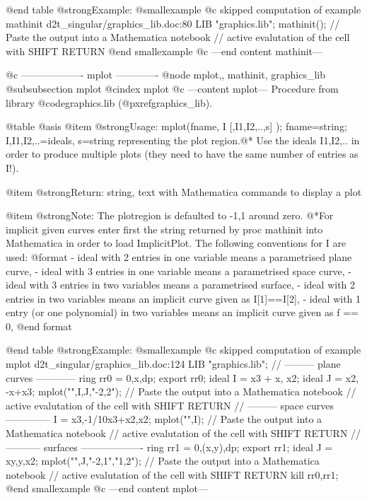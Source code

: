 @end table
@strong{Example:}
@smallexample
@c skipped computation of example mathinit d2t_singular/graphics_lib.doc:80 
LIB "graphics.lib";
mathinit();
// Paste the output into a Mathematica notebook
// active evalutation of the cell with SHIFT RETURN
@end smallexample
@c ---end content mathinit---

@c ------------------- mplot -------------
@node mplot,, mathinit, graphics_lib
@subsubsection mplot
@cindex mplot
@c ---content mplot---
Procedure from library @code{graphics.lib} (@pxref{graphics_lib}).

@table @asis
@item @strong{Usage:}
mplot(fname, I [,I1,I2,..,s] ); fname=string; I,I1,I2,..=ideals,
s=string representing the plot region.@*
Use the ideals I1,I2,.. in order to produce multiple plots (they need
to have the same number of entries as I!).

@item @strong{Return:}
string, text with Mathematica commands to display a plot

@item @strong{Note:}
The plotregion is defaulted to -1,1 around zero.
@*For implicit given curves enter first the string returned by
proc mathinit into Mathematica in order to load ImplicitPlot.
The following conventions for I are used:
  @format
  - ideal with 2 entries in one variable means a parametrised plane curve,
  - ideal with 3 entries in one variable means a parametrised space curve,
  - ideal with 3 entries in two variables means a parametrised surface,
  - ideal with 2 entries in two variables means an implicit curve
    given as I[1]==I[2],
  - ideal with 1 entry (or one polynomial) in two variables means
    an implicit curve given as  f == 0,
  @end format

@end table
@strong{Example:}
@smallexample
@c skipped computation of example mplot d2t_singular/graphics_lib.doc:124 
LIB "graphics.lib";
// ---------  plane curves ------------
ring rr0 = 0,x,dp; export rr0;
ideal I = x3 + x, x2;
ideal J = x2, -x+x3;
mplot("",I,J,"-2,2");
// Paste the output into a Mathematica notebook
// active evalutation of the cell with SHIFT RETURN
// --------- space curves --------------
I = x3,-1/10x3+x2,x2;
mplot("",I);
// Paste the output into a Mathematica notebook
// active evalutation of the cell with SHIFT RETURN
// ----------- surfaces -------------------
ring rr1 = 0,(x,y),dp; export rr1;
ideal J = xy,y,x2;
mplot("",J,"-2,1","1,2");
// Paste the output into a Mathematica notebook
// active evalutation of the cell with SHIFT RETURN
kill rr0,rr1;
@end smallexample
@c ---end content mplot---
